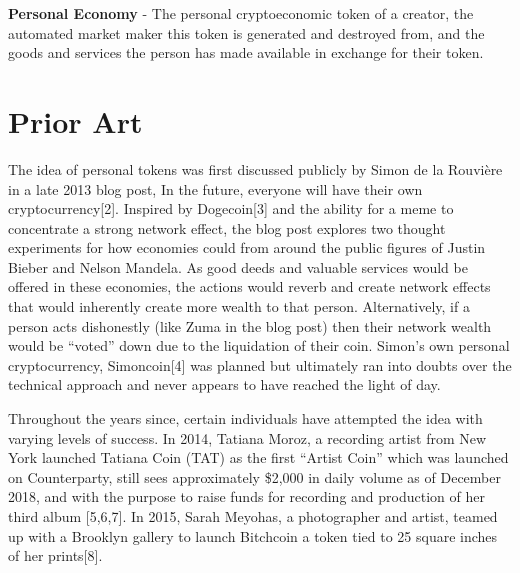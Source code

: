 \documentclass[a4paper, 10pt]{article}
\begin{document}
\begin{appendices}
\noindent
\textbf{Personal Economy} - The personal cryptoeconomic token of a creator, the automated market maker this token is generated and destroyed from, and the goods and services the person has made available in exchange for their token.

\section{Prior Art}

The idea of personal tokens was first discussed publicly by Simon de la Rouvière in a late 2013 blog post,  In the future, everyone will have their own cryptocurrency[2]. Inspired by Dogecoin[3] and the ability for a meme to concentrate a strong network effect, the blog post explores two thought experiments for how economies could from around the public figures of Justin Bieber and Nelson Mandela. As good deeds and valuable services would be offered in these economies, the actions would reverb and create network effects that would inherently create more wealth to that person. Alternatively, if a person acts dishonestly (like Zuma in the blog post) then their network wealth would be “voted” down due to the liquidation of their coin.  Simon’s own personal cryptocurrency, Simoncoin[4] was planned but ultimately ran into doubts over the technical approach and never appears to have reached the light of day.

Throughout the years since, certain individuals have attempted the idea with varying levels of success. In 2014, Tatiana Moroz, a recording artist from New York launched Tatiana Coin (TAT) as the first “Artist Coin” which was launched on Counterparty, still sees approximately \$2,000 in daily volume as of December 2018, and with the purpose to raise funds for recording and production of her third album [5,6,7]. In 2015, Sarah Meyohas, a photographer and artist, teamed up with a Brooklyn gallery to launch Bitchcoin a token tied to 25 square inches of her prints[8]. 

\end{appendices}
\end{document}
